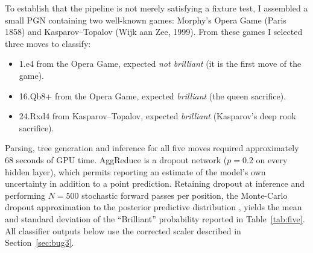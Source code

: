 \documentclass[11pt,a4paper]{article}
\begin{document}
To establish that the pipeline is not merely satisfying a fixture
test, I assembled a small PGN containing two well-known games:
Morphy's Opera Game (Paris 1858) and Kasparov--Topalov (Wijk aan Zee,
1999). From these games I selected three moves to classify:

\begin{itemize}[leftmargin=*]
  \item 1.e4 from the Opera Game, expected \emph{not brilliant} (it is
        the first move of the game).
  \item 16.Qb8+ from the Opera Game, expected \emph{brilliant} (the
        queen sacrifice).
  \item 24.Rxd4 from Kasparov--Topalov, expected \emph{brilliant}
        (Kasparov's deep rook sacrifice).
\end{itemize}

Parsing, tree generation and inference for all five moves required
approximately 68 seconds of GPU time. AggReduce is a dropout network
($p = 0.2$ on every hidden layer), which permits reporting an estimate
of the model's own uncertainty in addition to a point prediction.
Retaining dropout at inference and performing $N = 500$ stochastic
forward passes per position, the Monte-Carlo dropout approximation to
the posterior predictive distribution \citep{gal2016dropout}, yields
the mean and standard deviation of the ``Brilliant'' probability
reported in Table~\ref{tab:five}. All classifier outputs below use the
corrected scaler described in Section~\ref{sec:bug3}.
\end{document}
